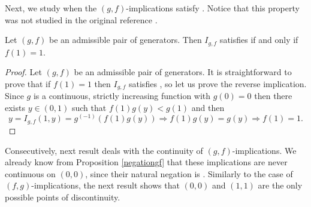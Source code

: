 Next, we study when the $(g,f)$-implications satisfy \NP. Notice that this property was not studied in the original reference \cite{Massanet2013B}.
\begin{proposition}\label{prop:(g,f)(NP)}
	Let $(g,f)$ be an admissible pair of generators. Then $I_{g,f}$ satisfies \NP if and only if $f(1)=1$.
\end{proposition}
\begin{proof}
	Let $(g,f)$ be an admissible pair of generators. It is straightforward to prove that if $f(1)=1$ then $I_{g,f}$ satisfies \NP, so let us prove the reverse implication. Since $g$ is a continuous, strictly increasing function with $g(0)=0$ then there exists $y \in (0,1)$ such that $f(1)g(y)<g(1)$ and then
	$$y=I_{g,f}(1,y)=g^{(-1)}(f(1)g(y)) \Rightarrow f(1)g(y)=g(y) \Rightarrow f(1)=1.$$
\end{proof}

Consecutively, next result deals with the continuity of $(g,f)$-implications. We already know from Proposition \ref{negationgf} that these implications are never continuous on $(0,0)$, since their natural negation is \NDOne. Similarly to the case of $(f,g)$-implications, the next result shows that $(0,0)$ and $(1,1)$ are the only possible points of discontinuity.

